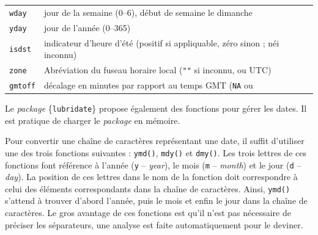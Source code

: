 \documentclass[
  11pt,
]{book}
\numberwithin{equation}{section}
\numberwithin{countremarque}{section}
\begin{document}
\begin{longtable}[]{@{}ll@{}}
\begin{minipage}[t]{0.19\columnwidth}
\texttt{wday}\strut
\end{minipage} & \begin{minipage}[t]{0.75\columnwidth}\raggedright
jour de la semaine (0--6), début de semaine le dimanche\strut
\end{minipage}\tabularnewline
\begin{minipage}[t]{0.19\columnwidth}\raggedright
\texttt{yday}\strut
\end{minipage} & \begin{minipage}[t]{0.75\columnwidth}\raggedright
jour de l'année (0--365)\strut
\end{minipage}\tabularnewline
\begin{minipage}[t]{0.19\columnwidth}\raggedright
\texttt{isdst}\strut
\end{minipage} & \begin{minipage}[t]{0.75\columnwidth}\raggedright
indicateur d'heure d'été (positif si appliquable, zéro sinon ; néi inconnu)\strut
\end{minipage}\tabularnewline
\begin{minipage}[t]{0.19\columnwidth}\raggedright
\texttt{zone}\strut
\end{minipage} & \begin{minipage}[t]{0.75\columnwidth}\raggedright
Abréviation du fuseau horaire local (\texttt{""} si inconnu, ou UTC)\strut
\end{minipage}\tabularnewline
\begin{minipage}[t]{0.19\columnwidth}\raggedright
\texttt{gmtoff}\strut
\end{minipage} & \begin{minipage}[t]{0.75\columnwidth}\raggedright
décalage en minutes par rapport au temps GMT (\texttt{NA} ou\strut
\end{minipage}\tabularnewline
\bottomrule
\end{longtable}

Le \emph{package} \{\texttt{lubridate}\} propose également des fonctions pour gérer les dates. Il est pratique de charger le \emph{package} en mémoire.

Pour convertir une chaîne de caractères représentant une date, il suffit d'utiliser une des trois fonctions suivantes : \texttt{ymd()}, \texttt{mdy()} et \texttt{dmy()}. Les trois lettres de ces fonctions font référence à l'année (\texttt{y} -- \emph{year}), le mois (\texttt{m} -- \emph{month}) et le jour (\texttt{d} -- \emph{day}). La position de ces lettres dans le nom de la fonction doit correspondre à celui des éléments correspondants dans la chaîne de caractères. Ainsi, \texttt{ymd()} s'attend à trouver d'abord l'année, puis le mois et enfin le jour dans la chaîne de caractères. Le gros avantage de ces fonctions est qu'il n'est pas nécessaire de préciser les séparateurs, une analyse est faite automatiquement pour le deviner.
\end{document}
